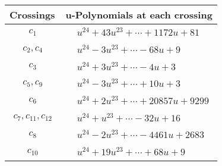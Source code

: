 \documentclass[1p]{elsarticle_modified}
\theoremstyle{definition}
\begin{document}
\begin{tabular}{m{50pt}|m{274pt}}
Crossings & \hspace{64pt}u-Polynomials at each crossing \\
\hline $$\begin{aligned}c_{1}\end{aligned}$$&$\begin{aligned}
&u^{24}+43 u^{23}+\cdots+1172 u+81
\end{aligned}$\\
\hline $$\begin{aligned}c_{2},c_{4}\end{aligned}$$&$\begin{aligned}
&u^{24}-3 u^{23}+\cdots-68 u+9
\end{aligned}$\\
\hline $$\begin{aligned}c_{3}\end{aligned}$$&$\begin{aligned}
&u^{24}+3 u^{23}+\cdots-4 u+3
\end{aligned}$\\
\hline $$\begin{aligned}c_{5},c_{9}\end{aligned}$$&$\begin{aligned}
&u^{24}-3 u^{23}+\cdots+10 u+3
\end{aligned}$\\
\hline $$\begin{aligned}c_{6}\end{aligned}$$&$\begin{aligned}
&u^{24}+2 u^{23}+\cdots+20857 u+9299
\end{aligned}$\\
\hline $$\begin{aligned}c_{7},c_{11},c_{12}\end{aligned}$$&$\begin{aligned}
&u^{24}+u^{23}+\cdots-32 u+16
\end{aligned}$\\
\hline $$\begin{aligned}c_{8}\end{aligned}$$&$\begin{aligned}
&u^{24}-2 u^{23}+\cdots-4461 u+2683
\end{aligned}$\\
\hline $$\begin{aligned}c_{10}\end{aligned}$$&$\begin{aligned}
&u^{24}+19 u^{23}+\cdots+68 u+9
\end{aligned}$\\
\hline
\end{tabular}\\~\\
\end{document}
